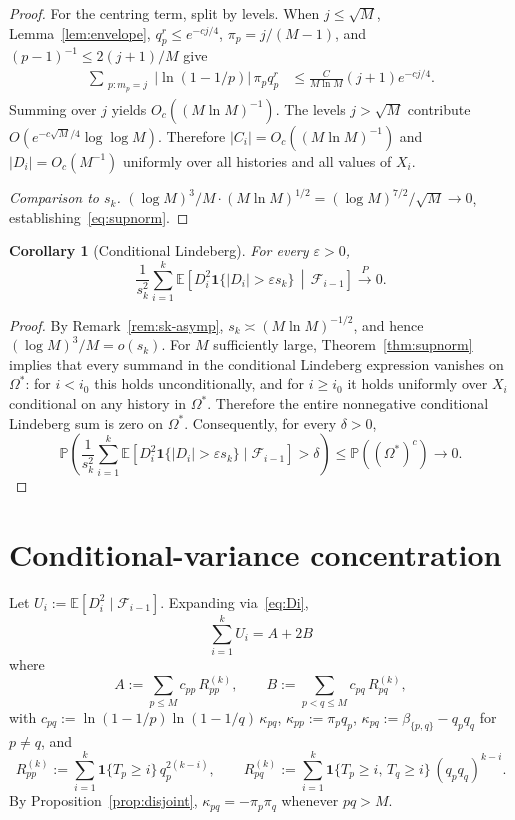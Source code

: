 \documentclass[11pt]{article}
\newtheorem{corollary}[theorem]{Corollary}
\theoremstyle{remark}
\newcommand{\PP}{\mathbb{P}}
\newcommand{\EE}{\mathbb{E}}
\newcommand{\F}{\mathcal{F}}
\newcommand{\one}{\mathbf{1}}
\begin{document}
\begin{proof}
For the centring term, split by levels. When $j\leq\sqrt M$, Lemma~\ref{lem:envelope}, $q_p^r\leq e^{-cj/4}$, $\pi_p=j/(M-1)$, and $(p-1)^{-1}\leq2(j+1)/M$ give
\begin{align*}
\sum_{\substack{p:m_p=j}} |\ln(1-1/p)|\,\pi_p q_p^r
&\leq \frac{C}{M\ln M}(j+1)e^{-cj/4}.
\end{align*}
Summing over $j$ yields $O_c((M\ln M)^{-1})$. The levels $j>\sqrt M$ contribute
$O(e^{-c\sqrt M/4}\log\log M)$. Therefore $|C_i|=O_c((M\ln M)^{-1})$ and
$|D_i|=O_c(M^{-1})$ uniformly over all histories and all values of $X_i$.

\textit{Comparison to $s_k$.}
$(\log M)^3/M \cdot (M \ln M)^{1/2} = (\log M)^{7/2}/\sqrt{M} \to 0$, establishing~\eqref{eq:supnorm}.
\end{proof}

\begin{corollary}[Conditional Lindeberg]\label{cor:HH2}
For every $\varepsilon > 0$,
\[
\frac{1}{s_k^2} \sum_{i=1}^k \EE\!\left[D_i^2 \one\{|D_i| > \varepsilon s_k\} \,\middle|\, \F_{i-1}\right] \xrightarrow{P} 0.
\]
\end{corollary}

\begin{proof}
By Remark~\ref{rem:sk-asymp}, $s_k \asymp (M\ln M)^{-1/2}$, and hence $(\log M)^3/M=o(s_k)$. For $M$ sufficiently large, Theorem~\ref{thm:supnorm} implies that every summand in the conditional Lindeberg expression vanishes on $\Omega^*$: for $i<i_0$ this holds unconditionally, and for $i\geq i_0$ it holds uniformly over $X_i$ conditional on any history in $\Omega^*$. Therefore the entire nonnegative conditional Lindeberg sum is zero on $\Omega^*$. Consequently, for every $\delta>0$,
\[
\PP\!\left(\frac{1}{s_k^2}\sum_{i=1}^k \EE\!\left[D_i^2\one\{|D_i|>\varepsilon s_k\}\mid\F_{i-1}\right]>\delta\right)
\leq \PP((\Omega^*)^c)\longrightarrow 0.
\]
\end{proof}

\section{Conditional-variance concentration}\label{sec:condvar}

Let $U_i := \EE[D_i^2 \mid \F_{i-1}]$. Expanding via~\eqref{eq:Di},
\[
\sum_{i=1}^k U_i = A + 2B
\]
where
\[
A := \sum_{p \leq M} c_{pp}\, R_{pp}^{(k)}, \qquad B := \sum_{p < q \leq M} c_{pq}\, R_{pq}^{(k)},
\]
with $c_{pq} := \ln(1 - 1/p) \ln(1 - 1/q)\, \kappa_{pq}$, $\kappa_{pp} := \pi_p q_p$, $\kappa_{pq} := \beta_{\{p,q\}} - q_p q_q$ for $p \neq q$, and
\[
R_{pp}^{(k)} := \sum_{i=1}^k \one\{T_p \geq i\}\, q_p^{2(k-i)}, \qquad R_{pq}^{(k)} := \sum_{i=1}^k \one\{T_p \geq i,\, T_q \geq i\}\, (q_p q_q)^{k-i}.
\]
By Proposition~\ref{prop:disjoint}, $\kappa_{pq} = -\pi_p \pi_q$ whenever $pq > M$.
\end{document}
